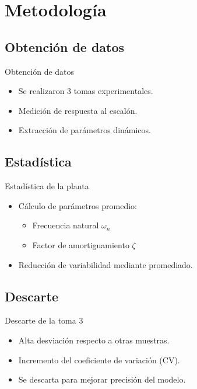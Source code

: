 \documentclass[mathserif,spanish]{beamer}
\begin{document}
\section{Metodología}

\subsection{Obtención de datos}

\begin{frame}{Obtención de datos}
\begin{itemize}
\item Se realizaron 3 tomas experimentales.
\item Medición de respuesta al escalón.
\item Extracción de parámetros dinámicos.
\end{itemize}
\end{frame}

\subsection{Estadística}

\begin{frame}{Estadística de la planta}
\begin{itemize}
\item Cálculo de parámetros promedio:
\begin{itemize}
\item Frecuencia natural $\omega_n$
\item Factor de amortiguamiento $\zeta$
\end{itemize}
\item Reducción de variabilidad mediante promediado.
\end{itemize}
\end{frame}

\subsection{Descarte}

\begin{frame}{Descarte de la toma 3}
\begin{itemize}
\item Alta desviación respecto a otras muestras.
\item Incremento del coeficiente de variación (CV).
\item Se descarta para mejorar precisión del modelo.
\end{itemize}
\end{frame}
\end{document}
